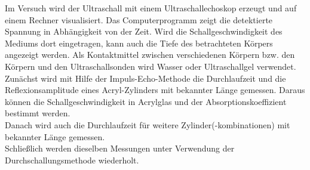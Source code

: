 Im Versuch wird der Ultraschall mit einem Ultraschallechoskop erzeugt und auf einem Rechner visualisiert. Das Computerprogramm zeigt die detektierte Spannung in Abhängigkeit von der Zeit. Wird die Schallgeschwindigkeit des Mediums dort eingetragen, kann auch die Tiefe des betrachteten Körpers angezeigt werden. Als Kontaktmittel zwischen verschiedenen Körpern bzw. den Körpern und den Ultraschallsonden wird Wasser oder Ultraschallgel verwendet. \\
Zunächst wird mit Hilfe der Impuls-Echo-Methode die Durchlaufzeit und die Reflexionsamplitude eines Acryl-Zylinders mit bekannter Länge gemessen. Daraus können die Schallgeschwindigkeit in Acrylglas und der Absorptionskoeffizient bestimmt werden. \\
Danach wird auch die Durchlaufzeit für weitere Zylinder(-kombinationen) mit bekannter Länge gemessen. \\
Schließlich werden dieselben Messungen unter Verwendung der Durchschallungsmethode wiederholt.
